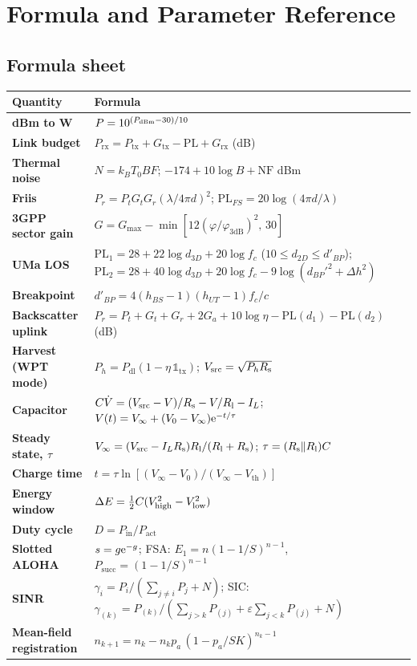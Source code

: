 \chapter{Formula and Parameter Reference}
\label{app:ref}

\section{Formula sheet}

\begin{center}
\small
\renewcommand{\arraystretch}{1.3}
\begin{tabularx}{\linewidth}{@{}>{\sffamily\bfseries}p{3.5cm}X@{}}
\toprule
Quantity & Formula\\
\midrule
dBm to W & $P=10^{(P_{\mathrm{dBm}}-30)/10}$\\
Link budget & $P_{\mathrm{rx}}=P_{\mathrm{tx}}+G_{\mathrm{tx}}-\mathrm{PL}+G_{\mathrm{rx}}$ (dB)\\
Thermal noise & $N=k_BT_0BF$; $-174+10\log B+\mathrm{NF}$ dBm\\
Friis & $P_r=P_tG_tG_r(\lambda/4\pi d)^2$; $\mathrm{PL}_{FS}=20\log(4\pi d/\lambda)$\\
3GPP sector gain & $G=G_{\max}-\min[12(\varphi/\varphi_{3\mathrm{dB}})^2,\,30]$\\
UMa LOS & $\mathrm{PL}_1=28+22\log d_{3D}+20\log f_c$ ($10\le d_{2D}\le d'_{BP}$); $\mathrm{PL}_2=28+40\log d_{3D}+20\log f_c-9\log(d_{BP}'^2+\Delta h^2)$\\
Breakpoint & $d'_{BP}=4(h_{BS}-1)(h_{UT}-1)f_c/c$\\
Backscatter uplink & $P_r=P_t+G_t+G_r+2G_a+10\log\eta-\mathrm{PL}(d_1)-\mathrm{PL}(d_2)$ (dB)\\
Harvest (WPT mode) & $P_h=P_{\mathrm{dl}}(1-\eta\,\mathbb 1_{\mathrm{tx}})$; $V_{\mathrm{src}}=\sqrt{P_hR_{\mathrm{s}}}$\\
Capacitor & $C\dot V=(V_{\mathrm{src}}-V)/R_{\mathrm{s}}-V/R_{\mathrm{l}}-I_L$; $V(t)=V_\infty+(V_0-V_\infty)\mathrm{e}^{-t/\tau}$\\
Steady state, $\tau$ & $V_\infty=(V_{\mathrm{src}}-I_LR_{\mathrm{s}})R_{\mathrm{l}}/(R_{\mathrm{l}}+R_{\mathrm{s}})$; $\tau=(R_{\mathrm{s}}\|R_{\mathrm{l}})C$\\
Charge time & $t=\tau\ln[(V_\infty-V_0)/(V_\infty-V_{\mathrm{th}})]$\\
Energy window & $\Delta E=\tfrac12C(V_{\mathrm{high}}^2-V_{\mathrm{low}}^2)$\\
Duty cycle & $D=P_{\mathrm{in}}/P_{\mathrm{act}}$\\
Slotted ALOHA & $s=g\mathrm{e}^{-g}$; FSA: $E_1=n(1-1/S)^{n-1}$, $P_{\mathrm{succ}}=(1-1/S)^{n-1}$\\
SINR & $\gamma_i=P_i/(\sum_{j\ne i}P_j+N)$; SIC: $\gamma_{(k)}=P_{(k)}/(\sum_{j>k}P_{(j)}+\varepsilon\sum_{j<k}P_{(j)}+N)$\\
Mean-field registration & $n_{k+1}=n_k-n_kp_a\,(1-p_a/SK)^{n_k-1}$\\
\bottomrule
\end{tabularx}
\end{center}


